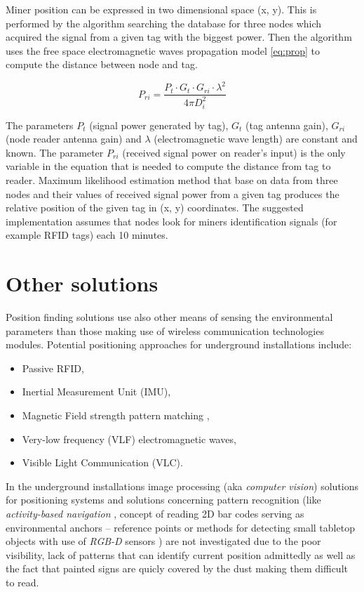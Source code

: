 \documentclass[../main.tex]{subfiles}
\begin{document}
Miner position can be expressed in two dimensional space (x, y). This is performed by the algorithm searching the database for three nodes which acquired the signal from a given tag with the biggest power. Then the algorithm uses the free space electromagnetic waves propagation model \eqref{eq:prop} to compute the distance between node and tag.

\begin{equation}
\label{eq:prop}
P_{ri}=\frac{P_t \cdot G_t \cdot G_{ri} \cdot \lambda^2}{4\pi D_i^2}
\end{equation}

The parameters $P_t$ (signal power generated by tag), $G_t$ (tag antenna gain), $G_{ri}$ (node reader antenna gain) and $\lambda$ (electromagnetic wave length) are constant and known. The parameter ${P_{ri}}$ (received signal power on reader's input) is the only variable in the equation that is needed to compute the distance from tag to reader. Maximum likelihood estimation method that base on data from three nodes and their values of received signal power from a given tag produces the relative position of the given tag in (x, y) coordinates. The suggested implementation \cite{WSN_tracking} assumes that nodes look for miners identification signals (for example RFID tags) each 10 minutes.

\section{Other solutions} %
\label{sec:other_solutions}

Position finding solutions use also other means of sensing the environmental parameters than those making use of wireless communication technologies modules. Potential positioning approaches for underground installations include:
\begin{itemize}
	\item Passive RFID,
	\item Inertial Measurement Unit (IMU),
	\item Magnetic Field strength pattern matching \cite{article_geomagn_navi_mine},
	\item Very-low frequency (VLF) electromagnetic waves,
	\item Visible Light Communication (VLC).
\end{itemize}

In the underground installations image processing (aka \textit{computer vision}) solutions for positioning systems and solutions concerning pattern recognition (like \textit{activity-based navigation} \cite{article_visual_points_AR_navi}, concept of reading 2D bar codes serving as environmental anchors -- reference points \cite{article_inertial_test_smartphone} or methods for detecting small tabletop objects with use of \textit{RGB-D} sensors \cite{article_sensors_for_indoor_navi}) are not investigated due to the poor visibility, lack of patterns that can identify current position admittedly as well as the fact that painted signs are quicly covered by the dust making them difficult to read.
\end{document}
